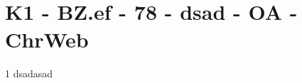 \section{K1 - BZ.ef - 78 - dsad - OA - ChrWeb}

\begin{langesbeispiel}\item[1] %
dsadasad

\end{langesbeispiel}